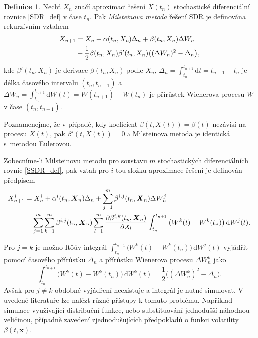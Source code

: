 \documentclass[a4paper,12pt]{report}
\theoremstyle{definition} \newtheorem{definice}[veta]{Definice}
\theoremstyle{remark}
\begin{document}
\begin{definice}\label{Milstein_def}
Nechť $X_n$ značí aproximaci řešení $X(t_{n})$ stochastické diferenciální rovnice \eqref{SDR_def} v čase $t_n$.
Pak \textit{Milsteinova metoda} řešení SDR je definována rekurzívním vztahem
\begin{align}\label{Milstein}
X_{n+1}&=X_n+\alpha(t_n,X_n)\Delta_n+\beta(t_n,X_n)\Delta W_n \\ \notag
&+\frac12\beta(t_n,X_n)\beta'(t_n,X_n)\big((\Delta W_n)^2-\Delta_n\big),
\end{align}
kde $\beta'(t_n,X_n)$ je derivace $\beta(t_n,X_n)$ podle $X_n$,
$\Delta_n=\int_{t_n}^{t_{n+1}}\mathrm{d}t=t_{n+1}-t_n$ je délka časového intervalu $(t_n,t_{n+1})$
a $\Delta W_n=\int_{t_n}^{t_{n+1}}\mathrm{d}W(t)=W(t_{n+1})-W(t_n)$ je přírůstek Wienerova procesu $W$ v čase $(t_n,t_{n+1})$.

Poznamenejme, že v případě, kdy koeficient $\beta(t,X(t))=\beta(t)$ nezávisí na procesu $X(t)$, pak $\beta'(t,X(t))=0$ a Milsteinova metoda je identická s~metodou Eulerovou.

Zobecníme-li Milsteinovu metodu pro soustavu $m$ stochastických diferenciálních rovnic \eqref{SSDR_def}, pak vztah pro $i$-tou složku aproximace řešení je definován předpisem
\begin{align}\label{Milstein_soustava}
X_{n+1}^i&=X_n^i+\alpha^i(t_n,\boldsymbol{X}_n)\Delta_n+\sum_{j=1}^m\beta^{i,j}(t_n,\boldsymbol{X}_n)\Delta W_n^j \\ \notag 
&+\sum_{j=1}^m\sum_{k=1}^m\beta^{i,j}(t_n,\boldsymbol{X}_n)\sum_{l=1}^m\frac{\partial\beta^{i,k}(t_n,\boldsymbol{X}_n)}{\partial X_l}\int_{t_n}^{t_{n+1}}\big(W^k(t)-W^k(t_n)\big)\,\mathrm{d}W^j(t).
\end{align}
\end{definice}

Pro $j=k$ je možno It\^oův integrál $\int_{t_n}^{t_{n+1}}\big(W^k(t)-W^k(t_n)\big)\,\mathrm{d}W^j(t)$ vyjádřit pomocí časového přírůstku $\Delta_n$ a přírůstku Wienerova procesu $\Delta W^k_n$ jako 
$$\int_{t_n}^{t_{n+1}}\big(W^k(t)-W^k(t_n)\big)\,\mathrm{d}W^k(t)=\frac12\big((\Delta W^k_n)^2-\Delta_n\big).$$
Avšak pro $j\neq k$ obdobné vyjádření neexistuje a integrál je nutné simulovat.
V uvedené literatuře lze nalézt různé přístupy k tomuto problému.
Například simulace využívající distribuční funkce, nebo substituování jednodušší náhodnou veličinou, případně zavedení zjednodušujících předpokladů o funkci volatility $\beta(t,\boldsymbol{x})$.
\end{document}
